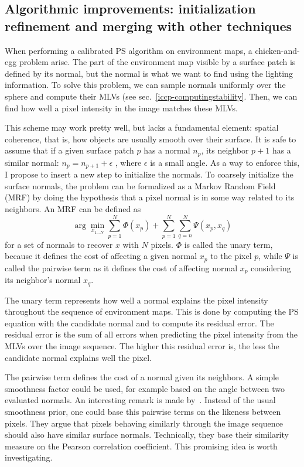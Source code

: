 \subsection{Algorithmic improvements: initialization refinement and merging with other techniques}
\label{subsec:calibrated}

When performing a calibrated PS algorithm on environment maps, a chicken-and-egg problem arise. The part of the environment map visible by a surface patch is defined by its normal, but the normal is what we want to find using the lighting information. To solve this problem, we can sample normals uniformly over the sphere and compute their MLVs (see sec.~\ref{iccp-computingstability}. Then, we can find how well a pixel intensity in the image matches these MLVs.

This scheme may work pretty well, but lacks a fundamental element: spatial coherence, that is, how objects are usually smooth over their surface. It is safe to assume that if a given surface patch $p$ has a normal $n_p$, its neighbor $p+1$ has a similar normal: $ n_p = n_{p+1} + \epsilon $ , where $\epsilon$ is a small angle. As a way to enforce this, I propose to insert a new step to initialize the normals. To coarsely initialize the surface normals, the problem can be formalized as a Markov Random Field (MRF) by doing the hypothesis that a pixel normal is in some way related to its neighbors. An MRF can be defined as
\begin{equation}
    \arg \min_{x_{1\ldots N}} \sum_{p=1}^N \Phi (x_p) + \sum_{p=1}^N \sum_{q=n}^N \Psi(x_p, x_q)
\end{equation}
for a set of normals to recover $x$ with $N$ pixels. $\Phi$ is called the unary term, because it defines the cost of affecting a given normal $x_p$ to the pixel $p$, while $\Psi$ is called the pairwise term as it defines the cost of affecting normal $x_p$ considering its neighbor's normal $x_q$.

The unary term represents how well a normal explains the pixel intensity throughout the sequence of environment maps. This is done by computing the PS equation with the candidate normal and to compute its residual error. The residual error is the sum of all errors when predicting the pixel intensity from the MLVs over the image sequence. The higher this residual error is, the less the candidate normal explains well the pixel.

The pairwise term defines the cost of a normal given its neighbors. A simple smoothness factor could be used, for example based on the angle between two evaluated normals. An interesting remark is made by~\cite{jung-cvpr-15}. Instead of the usual smoothness prior, one could base this pairwise terms on the likeness between pixels. They argue that pixels behaving similarly through the image sequence should also have similar surface normals. Technically, they base their similarity measure on the Pearson correlation coefficient. This promising idea is worth investigating.


